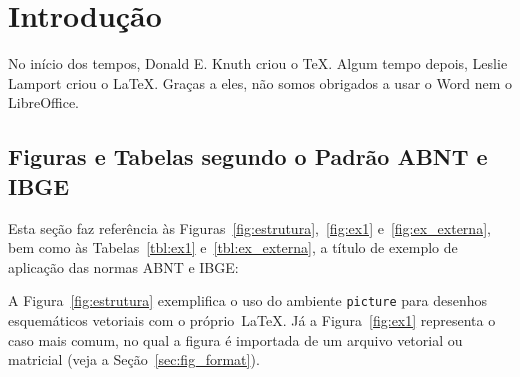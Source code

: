 \documentclass[ecp,tc,biblatex]{iiufrgs}
\begin{document}

\listoffigures

\listoftables

\tableofcontents


\chapter{Introdução}
No início dos tempos, Donald E. Knuth criou o \TeX. Algum tempo depois, Leslie Lamport criou o \LaTeX. Graças a eles, não somos obrigados a usar o Word nem o LibreOffice.

\section{Figuras e Tabelas segundo o Padrão ABNT e IBGE}

Esta seção faz referência às Figuras~\ref{fig:estrutura},~\ref{fig:ex1} e~\ref{fig:ex_externa}, bem como às Tabelas~\ref{tbl:ex1} e~\ref{tbl:ex_externa}, a título de exemplo de aplicação das normas ABNT e IBGE:

A Figura~\ref{fig:estrutura} exemplifica o uso do ambiente \texttt{picture} para desenhos esquemáticos vetoriais com o próprio~\LaTeX. Já a Figura~\ref{fig:ex1} representa o caso mais comum, no qual a figura é importada de um arquivo vetorial ou matricial (veja a Seção~\ref{sec:fig_format}).
\end{document}
